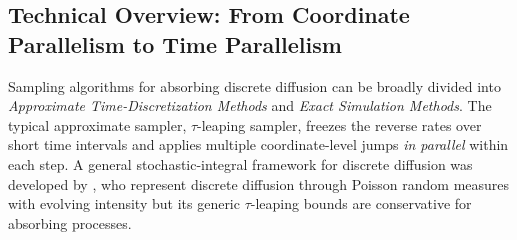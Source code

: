 \documentclass{article}
\begin{document}
\subsection{Technical Overview: From Coordinate Parallelism to Time Parallelism}
 Sampling algorithms for absorbing discrete diffusion can be broadly divided into \emph{Approximate Time-Discretization Methods} and \emph{Exact Simulation Methods}. The typical approximate sampler, $\tau$-leaping sampler, freezes the reverse rates over short time intervals and applies multiple coordinate-level jumps \emph{in parallel} within each step. A general stochastic-integral framework for discrete diffusion was developed by \citep{rendiscrete}, who represent discrete diffusion through Poisson random measures with evolving intensity
 but its generic $\tau$-leaping bounds are conservative for absorbing processes.
\end{document}
